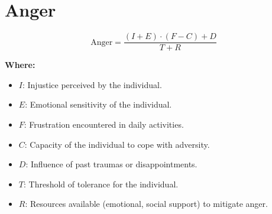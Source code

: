 \chapter{Anger}

\begin{equation}
\text{Anger} = \frac{(I + E) \cdot (F - C) + D}{T + R}
\end{equation}

\textbf{Where:}

\begin{itemize}
    \item $I$: Injustice perceived by the individual.
    \item $E$: Emotional sensitivity of the individual.
    \item $F$: Frustration encountered in daily activities.
    \item $C$: Capacity of the individual to cope with adversity.
    \item $D$: Influence of past traumas or disappointments.
    \item $T$: Threshold of tolerance for the individual.
    \item $R$: Resources available (emotional, social support) to mitigate anger.
\end{itemize}